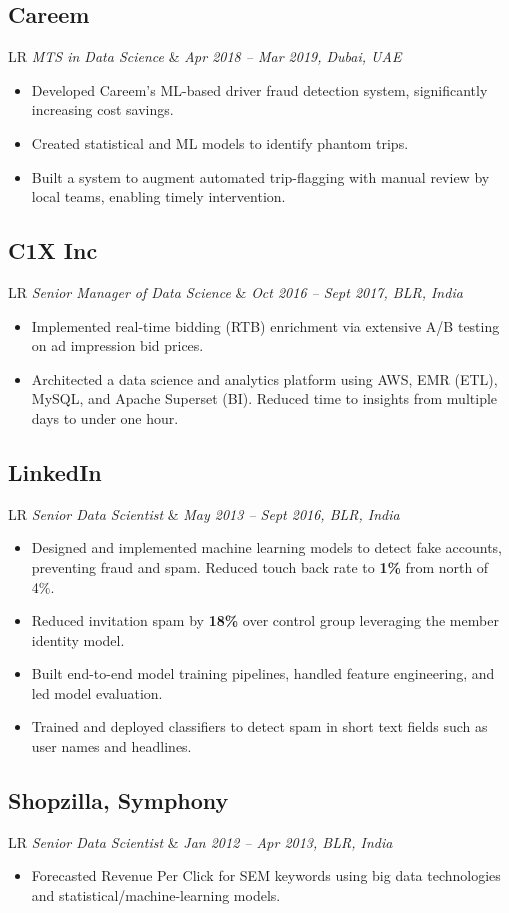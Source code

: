 \documentclass[11pt,a4paper]{moderncv}
\newcommand*{\experienceentry}[5][1mm]{
    \subsection{#2} \vspace{-1.5mm}
    \small{
    \begin{tabularx}{\textwidth}{LR}
        {\itshape #3} & {\itshape #4, #5}
    \end{tabularx}
    }
    \par\addvspace{#1}
}
\begin{document}
\begin{minipage}[t]{0.64\textwidth}
\experienceentry{Careem}{MTS in Data Science}{Apr 2018 -- Mar 2019}{Dubai, UAE}
\vspace{-5mm}
\begin{itemize}
    \item Developed Careem’s ML-based driver fraud detection system, significantly increasing cost savings.
    \item Created statistical and ML models to identify phantom trips.
    \item Built a system to augment automated trip-flagging with manual review by local teams, enabling timely intervention.
\end{itemize}
\vspace{0.5mm}

\experienceentry{C1X Inc}{Senior Manager of Data Science}{Oct 2016 -- Sept 2017}{BLR, India}
\vspace{-5mm}
\begin{itemize}
    \item Implemented real-time bidding (RTB) enrichment via extensive A/B testing on ad impression bid prices.
    \item Architected a data science and analytics platform using AWS, EMR (ETL), MySQL, and Apache Superset (BI). Reduced time to insights from multiple days to under one hour.
\end{itemize}
\vspace{0.5mm}

\experienceentry{LinkedIn}{Senior Data Scientist}{May 2013 -- Sept 2016}{BLR, India}
\vspace{-5mm}
\begin{itemize}
    \item Designed and implemented machine learning models to detect fake accounts, preventing fraud and spam. Reduced touch back rate to \textbf{1\%} from north of 4\%.
    \item Reduced invitation spam by \textbf{18\%} over control group leveraging the member identity model.
    \item Built end-to-end model training pipelines, handled feature engineering, and led model evaluation.
    \item Trained and deployed classifiers to detect spam in short text fields such as user names and headlines.
\end{itemize}

\experienceentry{Shopzilla, Symphony}{Senior Data Scientist}{Jan 2012 -- Apr 2013}{BLR, India}
\vspace{-5mm}
\begin{itemize}
    \item Forecasted Revenue Per Click for SEM keywords using big data technologies and statistical/machine-learning models.
\end{itemize}


\end{minipage}
\end{document}
